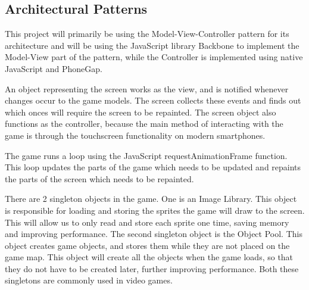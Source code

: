 \subsection{Architectural Patterns}

This project will primarily be using the Model-View-Controller pattern for its architecture and will be using the JavaScript library Backbone to implement the Model-View part of the pattern, while the Controller is implemented using native JavaScript and PhoneGap.


An object representing the screen works as the view, and is notified whenever changes occur to the game models. The screen collects these events and finds out which onces will require the screen to be repainted. The screen object also functions as the controller, because the main method of interacting with the game is through the touchscreen functionality on modern smartphones.


The game runs a loop using the JavaScript requestAnimationFrame function. This loop updates the parts of the game which needs to be updated and repaints the parts of the screen which needs to be repainted.


There are 2 singleton objects in the game. One is an Image Library. This object is responsible for loading and storing the sprites the game will draw to the screen. This will allow us to only read and store each sprite one time, saving memory and improving performance. The second singleton object is the Object Pool. This object creates game objects, and stores them while they are not placed on the game map. This object will create all the objects when the game loads, so that they do not have to be created later, further improving performance. Both these singletons are commonly used in video games.
